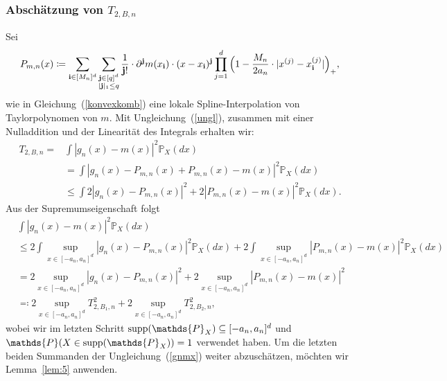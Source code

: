 {\subsubsection{Abschätzung von $T_{2,B,n}$}
Sei 
\begin{equation*}
\begin{split}
P_{m,n}(x) \coloneqq \sum_{\mathbf{i} \in [M_n]^d} \sum_{\substack{ \mathbf{j} \in [q]^d \\ |\mathbf{j}|_1 \leq q}} \frac{1}{\mathbf{j}!} \cdot \partial^{\mathbf{j}} m (x_{\mathbf{i}}) \cdot (x - x_{\mathbf{i}})^{\mathbf{j}} \prod_{j = 1}^d\Big(1 - \frac{M_n}{2a_n} \cdot |x^{(j)} - x_{\mathbf{i}}^{(j)}|\Big)_+,
\end{split}
\end{equation*}
wie in Gleichung~(\ref{konvexkomb}) eine lokale Spline-Interpolation von Taylorpolynomen von $m$.
Mit Ungleichung~(\ref{ungl}), zusammen mit einer Nulladdition und der Linearität des Integrals erhalten wir:
\begin{equation*}
\begin{split}
T_{2,B,n} = & \int |g_n(x) - m(x)|^2 \mathds{P}_X(dx) \\
& = \int |g_n(x) - P_{m,n}(x) + P_{m,n}(x) - m(x)|^2 \mathds{P}_X(dx) \\
& \leq \int 2 |g_n(x) - P_{m,n}(x)|^2 + 2 |P_{m,n}(x) - m(x)|^2 \mathds{P}_X(dx).
\end{split}
\end{equation*}
Aus der Supremumseigenschaft folgt
\begin{equation}
\label{gnmx}
\begin{split}
& \int |g_n(x) - m(x)|^2 \mathds{P}_X(dx) \\
& \leq 2 \int \sup_{x \in [-a_n, a_n]^d} |g_n(x) - P_{m,n}(x)|^2 \mathds{P}_X(dx) + 2 \int \sup_{x \in [-a_n, a_n]^d} |P_{m,n}(x) - m(x)|^2 \mathds{P}_X(dx) \\
& = 2 \sup_{x \in [-a_n, a_n]^d} |g_n(x) - P_{m,n}(x)|^2 + 2 \sup_{x \in [-a_n, a_n]^d} |P_{m,n}(x) - m(x)|^2  \\
& \eqqcolon 2 \sup_{x \in [-a_n, a_n]^d} T_{2,B_1,n}^2 + 2 \sup_{x \in [-a_n, a_n]^d} T_{2,B_2,n}^2,
\end{split}
\end{equation}
wobei wir im letzten Schritt $\supp(\mathds{P}_X) \subseteq [-a_n, a_n]^d$ und $\mathds{P}(X \in \supp(\mathds{P}_X)) = 1$ verwendet haben. Um die letzten beiden Summanden der Ungleichung~(\ref{gnmx}) weiter abzuschätzen, möchten wir Lemma~\ref{lem:5} anwenden. 

}
